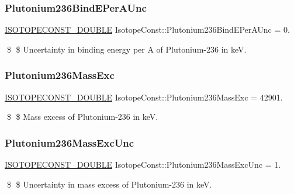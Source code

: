 \subsubsection{\texorpdfstring{Plutonium236\+Bind\+E\+Per\+A\+Unc}{Plutonium236BindEPerAUnc}}
{\footnotesize\ttfamily \mbox{\hyperlink{group___isotope_const-_macros_ga8f45a7272ce02c0b4c65c44636ed719a}{I\+S\+O\+T\+O\+P\+E\+C\+O\+N\+S\+T\+\_\+\+D\+O\+U\+B\+LE}} Isotope\+Const\+::\+Plutonium236\+Bind\+E\+Per\+A\+Unc = 0.}

\$ \$ Uncertainty in binding energy per A of Plutonium-\/236 in keV. \mbox{\label{group___isotope_const-_plutonium-_pu236_ga8ac63f6fe6641a20a5f220f72398a97e}} 
\subsubsection{\texorpdfstring{Plutonium236\+Mass\+Exc}{Plutonium236MassExc}}
{\footnotesize\ttfamily \mbox{\hyperlink{group___isotope_const-_macros_ga8f45a7272ce02c0b4c65c44636ed719a}{I\+S\+O\+T\+O\+P\+E\+C\+O\+N\+S\+T\+\_\+\+D\+O\+U\+B\+LE}} Isotope\+Const\+::\+Plutonium236\+Mass\+Exc = 42901.}

\$ \$ Mass excess of Plutonium-\/236 in keV. \mbox{\label{group___isotope_const-_plutonium-_pu236_ga1857496a491649c44047c2906d39c14c}} 
\subsubsection{\texorpdfstring{Plutonium236\+Mass\+Exc\+Unc}{Plutonium236MassExcUnc}}
{\footnotesize\ttfamily \mbox{\hyperlink{group___isotope_const-_macros_ga8f45a7272ce02c0b4c65c44636ed719a}{I\+S\+O\+T\+O\+P\+E\+C\+O\+N\+S\+T\+\_\+\+D\+O\+U\+B\+LE}} Isotope\+Const\+::\+Plutonium236\+Mass\+Exc\+Unc = 1.}

\$ \$ Uncertainty in mass excess of Plutonium-\/236 in keV. \mbox{\label{group___isotope_const-_plutonium-_pu236_gad30cb71ad10609676960355a6b959edf}} 
